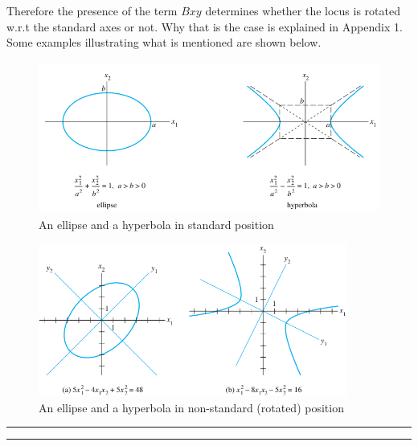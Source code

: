 \documentclass[a4paper]{article}
\numberwithin{equation}{section} %
\newcounter{example}
\newcommand{\sectionlinetwo}[2]{%
  \nointerlineskip \vspace{.5\baselineskip}\hspace{\fill}
  {\color{#1}
    {{%
    {\begin{tikzpicture}
    \node  (C) at (0,0) {};
    \node (D) at (9,0) {};
    \path (C) to [ornament=#2] (D);
    \end{tikzpicture}}}}}%
    \hspace{\fill}
    \par\nointerlineskip \vspace{.5\baselineskip}
  }
\begin{document}
Therefore the presence of the term $Bxy$ determines whether the locus is rotated w.r.t the standard axes or not. Why that is the case is explained in Appendix 1. Some examples illustrating what is mentioned are shown below.
\begin{figure}[H]
	\centering %
	\includegraphics[height=5cm]{conics_standard.png}
    \caption{An ellipse and a hyperbola in standard position \cite{lay}}
    \label{fig:conics1}
\end{figure}
\begin{figure}[H]
	\centering %
	\includegraphics[height=5cm]{conics_standard2.png}
    \caption{An ellipse and a hyperbola in non-standard (rotated) position \cite{lay}}
    \label{fig:conics2}
\end{figure}
{\centering
{\Large {}\rule{0.3\textwidth}{0.4pt}\hspace{0.2cm}  \hspace{0.2cm} \rule{0.3\textwidth }{0.4pt}}\par
}
\end{document}
